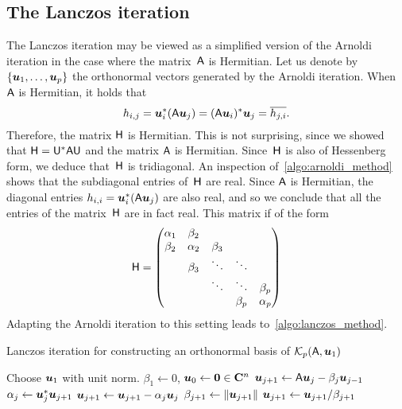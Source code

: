 \subsection{The Lanczos iteration}
The Lanczos iteration may be viewed as a simplified version of the Arnoldi iteration in the case where the matrix~$\mathsf A$ is Hermitian.
Let us denote by $\{ \mathbf{\boldsymbol{u}}_1, \dotsc, \mathbf{\boldsymbol{u}}_p \}$ the orthonormal vectors generated by the Arnoldi iteration.
When~$\mathsf A$ is Hermitian, it holds that
\[
    h_{i,j} = \mathbf{\boldsymbol{u}}_{i}^* (\mathsf A \mathbf{\boldsymbol{u}}_{j}) = (\mathsf A \mathbf{\boldsymbol{u}}_i)^* \mathbf{\boldsymbol{u}}_j = \overline{h_{j,i}}.
\]
Therefore, the matrix $\mathsf H$ is Hermitian.
This is not surprising, since we showed that $\mathsf H = \mathsf U^* \mathsf A \mathsf U$ and the matrix $\mathsf A$ is Hermitian.
Since~$\mathsf H$ is also of Hessenberg form,
we deduce that~$\mathsf H$ is tridiagonal.
An inspection of~\cref{algo:arnoldi_method} shows that the subdiagonal entries of~$\mathsf H$ are real.
Since $\mathsf A$ is Hermitian, the diagonal entries $h_{i,i} = \mathbf{\boldsymbol{u}}_{i}^* (\mathsf A \mathbf{\boldsymbol{u}}_{j})$ are also real,
and so we conclude that all the entries of the matrix~$\mathsf H$ are in fact real.
This matrix if of the form
\[
    \mathsf H
    =
    \begin{pmatrix}
        \alpha_1 & \beta_2 \\
        \beta_2 & \alpha_2 & \beta_3 \\
            & \beta_3 & \ddots & \ddots \\
            & & \ddots & \ddots & \beta_p \\
            & & & \beta_p & \alpha_p
    \end{pmatrix}
\]
Adapting the Arnoldi iteration to this setting leads to~\cref{algo:lanczos_method}.
\begin{algorithm}
\caption{Lanczos iteration for constructing an orthonormal basis of $\mathcal K_p(\mathsf A, \mathbf{\boldsymbol{u}}_1)$}%
\label{algo:lanczos_method}%
\begin{algorithmic}
\State Choose $\mathbf{\boldsymbol{u}}_1$ with unit norm.
\State $\beta_1 \gets 0$, $\mathbf{\boldsymbol{u}}_0 \gets \mathbf{\boldsymbol{0}} \in \mathbf C^n$
    \State $\mathbf{\boldsymbol{u}}_{j+1} \gets \mathsf A \mathbf{\boldsymbol{u}}_{j} - \beta_j \mathbf{\boldsymbol{u}}_{j-1}$
    \State $\alpha_j \gets \mathbf{\boldsymbol{u}}_{j}^* \mathbf{\boldsymbol{u}}_{j+1}$
    \State $\mathbf{\boldsymbol{u}}_{j+1} \gets \mathbf{\boldsymbol{u}}_{j+1} - \alpha_j \mathbf{\boldsymbol{u}}_{j}$
    \State $\beta_{j+1} \gets \lVert\mathbf{\boldsymbol{u}}_{j+1}\rVert$
    \State $\mathbf{\boldsymbol{u}}_{j+1} \gets \mathbf{\boldsymbol{u}}_{j+1} / \beta_{j+1}$
\EndFor
\end{algorithmic}
\end{algorithm}

